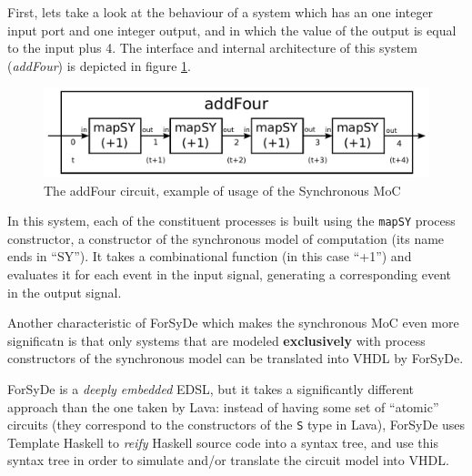 \documentclass[a4paper]{article}
\begin{document}
                First, lets take a look at the behaviour of a system which has an one integer input
                port and one integer output, and in which the value of the output is equal to the
                input plus 4. The interface and internal architecture of this system
                (\emph{addFour}) is depicted in figure \ref{fig:forsyde-addFour}.
                \begin{figure}[h]
                    \begin{center}
                        \includegraphics[width=1.0\textwidth]{imgs/forsyde-addFour.pdf}
                    \end{center}
                    \caption{The addFour circuit, example of usage of the Synchronous MoC
                        \label{fig:forsyde-addFour}}
                \end{figure}

                In this system, each of the constituent processes is built using the \texttt{mapSY}
                process constructor, a constructor of the synchronous model of computation (its name
                ends in ``SY''). It takes a combinational function (in this case ``+1'') and
                evaluates it for each event in the input signal, generating a corresponding event in
                the output signal.

                Another characteristic of ForSyDe which makes the synchronous MoC even more
                significatn is that only systems that are modeled \textbf{exclusively} with process
                constructors of the synchronous model can be translated into VHDL by ForSyDe.

                ForSyDe is a \emph{deeply embedded} EDSL, but it takes a significantly different
                approach than the one taken by Lava: instead of having some set of ``atomic''
                circuits (they correspond to the constructors of the \texttt{S} type in Lava),
                ForSyDe uses Template Haskell to \emph{reify} Haskell source code into a syntax
                tree, and use this syntax tree in order to simulate and/or translate the circuit
                model into VHDL.
\end{document}

